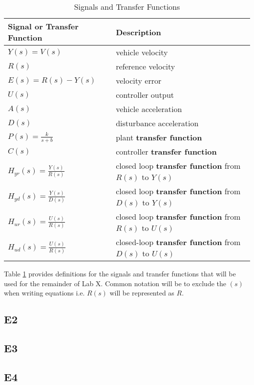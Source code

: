\documentclass[11pt,titlepage]{article}
\begin{document}
	\begin{table}[!htb]
		\centering
		\begin{tabular}{|m{5cm}|m{9cm}|} 
		\hline
		Signal or Transfer Function & Description \\ 
		\hline
		$Y(s)=V(s)$ & vehicle velocity \\
		\hline
		$R(s)$ & reference velocity \\
		\hline
		$E(s)=R(s)-Y(s)$ & velocity error \\
		\hline
		$U(s)$ & controller output \\
		\hline
		$A(s)$ & vehicle acceleration \\
		\hline
		$D(s)$ & disturbance acceleration \\
		\hline 
		$P(s)=\frac{k}{s+b}$ & plant \textbf{transfer function} \\
		\hline 
		$C(s)$ & controller \textbf{transfer function} \\
		\hline 
		$H_{yr}(s)=\frac{Y(s)}{R(s)}$ & closed loop \textbf{transfer function} from $R(s)$ to $Y(s)$ \\
		\hline 
		$H_{yd}(s)=\frac{Y(s)}{D(s)}$ & closed loop \textbf{transfer function} from $D(s)$ to $Y(s)$ \\
		\hline 
		$H_{ur}(s)=\frac{U(s)}{R(s)}$ & closed loop \textbf{transfer function} from $R(s)$ to $U(s)$ \\
		\hline
		$H_{ud}(s)=\frac{U(s)}{R(s)}$ & closed-loop \textbf{transfer function} from $D(s)$ to $U(s)$ \\
		\hline
		\end{tabular}
		\caption{Signals and Transfer Functions} \label{table:SaTF}
		\end{table}

		\noindent Table \ref{table:SaTF} provides definitions for the signals and transfer functions that will be used for the remainder of Lab X. Common notation will be to exclude the $(s)$ when writing equations i.e. $R(s)$ will be represented as $R$.

	\subsection*{E2}

	\subsection*{E3}

	\subsection*{E4}
\end{document}
